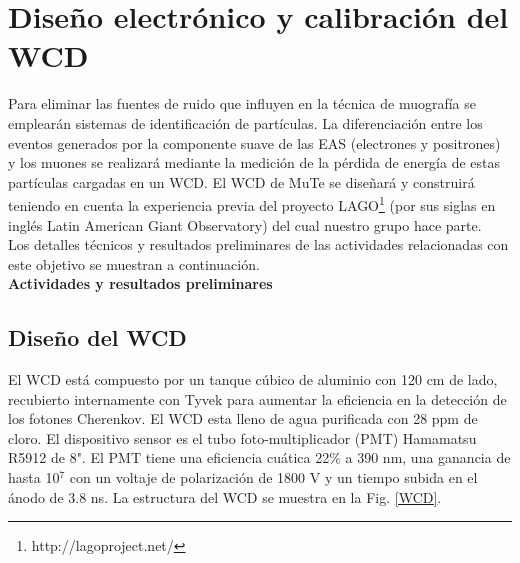 \section{Diseño electrónico y calibración del WCD}

Para eliminar las fuentes de ruido que influyen en la técnica de muografía se emplearán sistemas de identificación de partículas. La diferenciación entre los eventos generados por la componente suave de las EAS (electrones y positrones) y los muones se realizará mediante la medición de la pérdida de energía de estas partículas cargadas en un WCD. El WCD de MuTe se diseñará y construirá teniendo en cuenta la experiencia previa del proyecto LAGO\footnote{http://lagoproject.net/} (por sus siglas en inglés Latin American Giant Observatory) del cual nuestro grupo hace parte.\\

Los detalles técnicos y resultados preliminares de las actividades relacionadas con este objetivo se muestran a continuación.\\

\textbf{Actividades y resultados preliminares}\\

\subsection{Diseño del WCD}

El WCD está compuesto por un tanque cúbico de aluminio con 120 cm de lado, recubierto internamente con Tyvek para aumentar la eficiencia en la detección de los fotones Cherenkov. El WCD esta lleno de agua purificada con 28 ppm de cloro. El dispositivo sensor es el tubo foto-multiplicador (PMT) Hamamatsu R5912 de 8". El PMT tiene una eficiencia cuática 22$\%$ a 390 nm, una ganancia de hasta 10$^7$ con un voltaje de polarización de 1800 V y un tiempo subida en el ánodo de 3.8 ns. La estructura del WCD se muestra en la Fig. \ref{WCD}.\\

